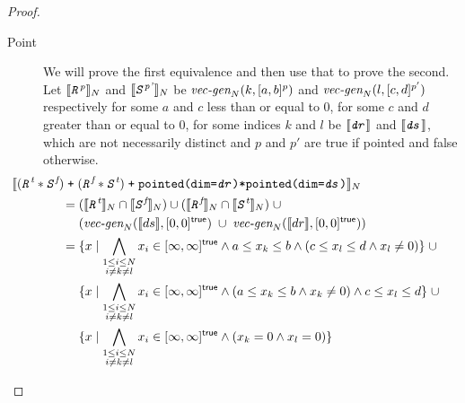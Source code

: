 \documentclass{article}
\theoremstyle{definition}
\theoremstyle{plain}
\newcommand{\interp}[1]{\llbracket#1\rrbracket}
\newcommand{\interv}[3]{\textnormal{$\lbrack#1,#2\rbrack^{#3}$}}
\newcommand{\vecgen}[3]{\textnormal{$\textit{vec-gen}_{#1}(#2,#3)$}}
\newcommand{\textcap}[1]{\texttt{\textit{#1}}}
\begin{document}
\begin{proof}
\begin{description}
    \item[Point] We will prove the first equivalence and then use that to prove
      the second.
%
      Let $\interp{\textcap{R}^{\textnormal{\textit{p}}}}_N$ and
      $\interp{\textcap{S}^{\textnormal{\textit{p'}}}}_N$ be
      $\vecgen{N}{k}{\interv{a}{b}{p}}$ and $\vecgen{N}{l}{\interv{c}{d}{p'}}$
      respectively for some $a$ and $c$ less than or equal to 0, for some $c$
      and $d$ greater than or equal to 0, for some indices $k$ and $l$ be
      $\interp{\textcap{dr}}$ and $\interp{\textcap{ds}}$, which are not
      necessarily distinct and $p$ and $p'$ are \textsf{true} if pointed and
      \textsf{false} otherwise.
%
      \begin{align*}
        \hspace{2em&\hspace{-2em}}
        \interp
          {{(\textcap{R}^{\textit{t}} * \textcap{S}^{\textit{f}})}
           \;\texttt{+}\;
           {(\textcap{R}^{\textit{f}} * \textcap{S}^{\textit{t}})}
           \;\texttt{+}\;
           \texttt{pointed(dim=\textcap{dr})*pointed(dim=\textcap{ds})}}_N \\
        & = {(\interp{\textcap{R}^{\textit{t}}}_N \cap
              \interp{\textcap{S}^{\textit{f}}}_N)} \cup
            {(\interp{\textcap{R}^{\textit{f}}}_N \cap
              \interp{\textcap{S}^{\textit{t}}}_N)} \;\cup \\
        & \quad\,\, {(\vecgen{N}{\interp{ds}}{\interv{0}{0}{\textsf{true}}}
                      \;\cup\;
                      \vecgen{N}{\interp{dr}}{\interv{0}{0}{\textsf{true}}})} \\
        & = \{ x \mid
            \bigwedge_{\substack{1 \leq i \leq N \\ i \neq k \neq l}} x_i \in
              \interv{\infty}{\infty}{\textsf{true}}
            \wedge a \leq x_k \leq b
            \wedge {(c \leq x_l \leq d \wedge x_l \neq 0)} \} \;\cup \\
        & \quad\,\, \{ x \mid
            \bigwedge_{\substack{1 \leq i \leq N \\ i \neq k \neq l}} x_i \in
              \interv{\infty}{\infty}{\textsf{true}}
            \wedge {(a \leq x_k \leq b \wedge x_k \neq 0)}
            \wedge c \leq x_l \leq d \} \;\cup \\
        & \quad\,\, \{ x \mid
            \bigwedge_{\substack{1 \leq i \leq N \\ i \neq k \neq l}} x_i \in
              \interv{\infty}{\infty}{\textsf{true}}
            \wedge (x_k = 0 \wedge x_l = 0) \} \\

\end{align*}
\end{description}
\end{proof}
\end{document}
